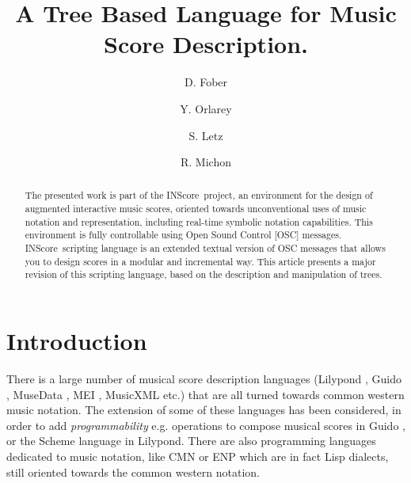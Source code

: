 \documentclass[runningheads]{llncs}
\newcommand{\IS}		{INScore}
\begin{document}
\title{A Tree Based Language for Music Score Description.}

\author{D. Fober \and
Y. Orlarey \and
S. Letz \and R. Michon}
%
%


\maketitle

%
\begin{abstract}
The presented work is part of the \IS\ project, an environment for the design of augmented interactive music scores, oriented towards unconventional uses of music notation and representation, including real-time symbolic notation capabilities. This environment is fully controllable using Open Sound Control [OSC] messages. \IS\ scripting language is an extended textual version of OSC messages that allows you to design scores in a modular and incremental way. This article presents a major revision of this scripting language, based on the description and manipulation of trees.

\end{abstract}
%

\section{Introduction}\label{sec:introduction}

There is a large number of musical score description languages (Lilypond \cite{lilypond03}, Guido \cite{hoos98}, MuseData \cite{Hewlett97}, MEI \cite{Roland_2002}, MusicXML \cite{good01} etc.) that are all turned towards common western music notation. 
The extension of some of these languages has been considered, in order to add \textit{programmability} e.g. operations to compose musical scores in Guido \cite{fober12b}, or the Scheme language in Lilypond.
There are also programming languages dedicated to music notation, like CMN \cite{Schottstaedt97} or ENP 
\cite{KUUSK06} which are in fact Lisp dialects, still oriented towards the common western notation.
\end{document}
